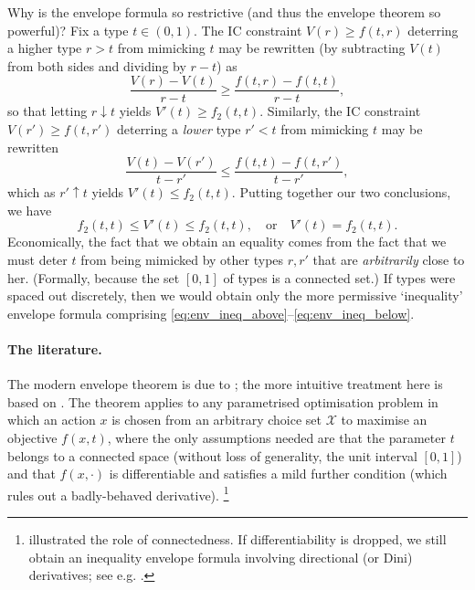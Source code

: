 \begin{remark}
	\label{remark:env_powerful}
	Why is the envelope formula so restrictive (and thus the envelope theorem so powerful)?
	Fix a type $t \in (0,1)$.
	The IC constraint $V(r) \geq f(t,r)$
	deterring a higher type $r>t$ from mimicking $t$
	may be rewritten (by subtracting $V(t)$ from both sides and dividing by $r-t$) as
	\begin{equation}
		\frac{V(r) - V(t)}{r-t} \geq \frac{f(t,r) - f(t,t)}{r-t} ,
		\label{eq:env_ineq_above}
	\end{equation}
	so that letting $r \downarrow t$ yields $V'(t) \geq f_2(t,t)$.
	Similarly, the IC constraint $V(r') \geq f(t,r')$
	deterring a \emph{lower} type $r'<t$ from mimicking $t$
	may be rewritten
	\begin{equation}
		\frac{V(t) - V(r')}{t-r'} \leq \frac{f(t,t) - f(t,r')}{t-r'} ,
		\label{eq:env_ineq_below}
	\end{equation}
	which as $r' \uparrow t$ yields $V'(t) \leq f_2(t,t)$.
	Putting together our two conclusions, we have
	\begin{equation*}
		f_2(t,t) \leq V'(t) \leq f_2(t,t) ,
		\quad \text{or} \quad
		V'(t) = f_2(t,t) .
	\end{equation*}
	Economically, the fact that we obtain an equality comes from the fact that we must deter $t$ from being mimicked by other types $r,r'$ that are \emph{arbitrarily} close to her. (Formally, because the set $[0,1]$ of types is a connected set.)
	If types were spaced out discretely, then we would obtain only the more permissive `inequality' envelope formula comprising \eqref{eq:env_ineq_above}--\eqref{eq:env_ineq_below}.
\end{remark}


\paragraph{The literature.}
The modern envelope theorem is due to \textcite{MilgromSegal2002};
the more intuitive treatment here is based on \textcite{Sinander2022}.
The theorem applies to any parametrised optimisation problem in which an action $x$ is chosen from an arbitrary choice set $\mathcal{X}$ to maximise an objective $f(x,t)$,
where the only assumptions needed are that the parameter $t$ belongs to a connected space (without loss of generality, the unit interval $[0,1]$) and that $f(x,\cdot)$ is differentiable and satisfies a mild further condition (which rules out a badly-behaved derivative).%
	\footnote{ illustrated the role of connectedness.
	If differentiability is dropped, we still obtain an inequality envelope formula involving directional (or Dini) derivatives; see e.g. \textcite{CarbajalEly2013}.}



